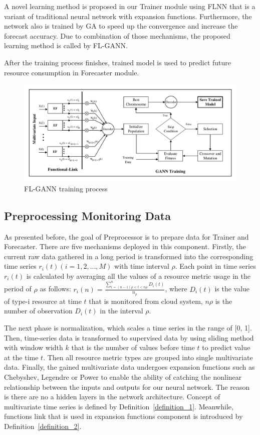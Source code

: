\documentclass[conference]{IEEEtran}
\begin{document}
A novel learning method is proposed in our Trainer module using FLNN that is a variant of traditional neural network with expansion functions. Furthermore, the network also is trained by GA to speed up the convergence and increase the forecast accuracy. Due to combination of those mechanisms, the proposed learning method is called by FL-GANN. 

After the training process finishes, trained model is used to predict future resource consumption in Forecaster module. 

\begin{figure}[htbp]
	\centerline{\includegraphics[width=0.7\textwidth =0.1cm 0.1cm 0.1cm 0.1cm, clip]{images/FLGANN_process.pdf}}
	\caption{FL-GANN training process}
	\label{FLGANN_process}
\end{figure}

\subsection{Preprocessing Monitoring Data}
\label{pre_precessor}

As presented before, the goal of Preprocessor is to prepare data for Trainer and Forecaster. There are five mechanisms deployed in this component. Firstly, the current raw data gathered in a long period is transformed into the corresponding time series $r_i(t) (i = 1, 2,..., M)$ with time interval $\rho$. Each point in time series $r_i(t)$ is calculated by averaging all the values of a resource metric usage in the period of $\rho$ as follows: $r_i(n) = \frac{ \sum_{i=(n-1)\rho < t < n\rho}^nD_i(t) }{ n_{\rho} }$, where $D_i(t)$ is the value of type-i resource at time $t$ that is monitored from cloud system, $n\rho$ is the number of observation $D_i(t)$ in the interval $\rho$. 

The next phase is normalization, which scales a time series in the range of [0, 1]. Then, time-series data is transformed to supervised data by using sliding method with window width $k$ that is the number of values before time $t$ to predict value at the time $t$. Then all resource metric types are grouped into single multivariate data. Finally, the gained multivariate data undergoes expansion functions such as Chebyshev, Legendre or Power to enable the ability of catching the nonlinear relationship between the inputs and outputs for our neural network. The reason is there are no a hidden layers in the network architecture. Concept of multivariate time series is defined by Definition~\ref{definition_1}. Meanwhile, functions link that is used in expansion functions component is introduced by Definition~\ref{definition_2}.
\end{document}
